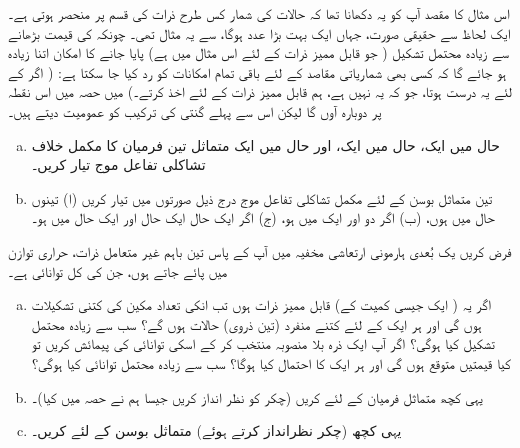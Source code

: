 اس مثال کا مقصد آپ کو یہ دکھانا تھا کہ حالات کی شمار کس طرح ذرات کی قسم پر منحصر ہوتی ہے۔ ایک لحاظ سے حقیقی صورت، جہاں  ایک بہت بڑا عدد ہوگا، سے یہ مثال  تھی۔ چونکہ  کی قیمت بڑھانے سے زیادہ محتمل تشکیل ( جو قابل ممیز ذرات کے لئے اس مثال میں  ہے) پایا جانے کا امکان اتنا زیادہ ہو جائے گا کہ کسی بھی شماریاتی مقاصد کے لئے باقی تمام امکانات کو رد کیا جا سکتا ہے: ( اگر  کے لئے یہ درست ہوتا، جو کہ یہ نہیں ہے، ہم قابل ممیز ذرات کے لئے  اخذ کرتے۔) میں حصہ  میں اس نقطہ پر دوبارہ آوں گا لیکن اس سے پہلے گنتی کی ترکیب کو عمومیت دیتے ہیں۔



\begin{enumerate}[a.]
\item
حال  میں ایک، حال  میں ایک، اور حال  میں ایک متماثل تین فرمیان کا مکمل خلاف تشاکلی تفاعل موج  تیار کریں۔
\item
 تین متماثل بوسن کے لئے مکمل تشاکلی تفاعل موج درج ذیل صورتوں میں تیار کریں (ا) تینوں حال  میں ہوں، (ب) اگر دو  اور ایک  میں ہو، (ج) اگر ایک حال  ایک حال  اور ایک حال  میں ہو۔ 
\end{enumerate}
فرض کریں یک بُعدی ہارمونی ارتعاشی مخفیہ میں آپ کے پاس تین باہم غیر متعامل ذرات، حراری توازن میں پائے جاتے ہوں، جن کی کل توانائی ہے۔
\begin{enumerate}[a.]
\item
 اگر یہ ( ایک جیسی کمیت کے) قابل ممیز ذرات ہوں تب انکی تعداد مکین کی کتنی تشکیلات ہوں گی اور ہر ایک کے لئے کتنے منفرد (تین ذروی) حالات ہوں گے؟ سب سے زیادہ محتمل تشکیل کیا ہوگی؟ اگر آپ ایک ذرہ بلا منصوبہ منتخب کر کے اسکی توانائی کی پیمائش کریں تو کیا قیمتیں متوقع ہوں گی اور ہر ایک کا احتمال کیا ہوگا؟ سب سے زیادہ محتمل توانائی کیا ہوگی؟
\item
 یہی کچھ متماثل فرمیان کے لئے کریں (چکر کو نظر انداز کریں جیسا ہم نے حصہ  میں کیا)۔
\item
 یہی کچھ (چکر نظرانداز کرتے ہوئے) متماثل بوسن کے لئے کریں۔ 
 \end{enumerate}

